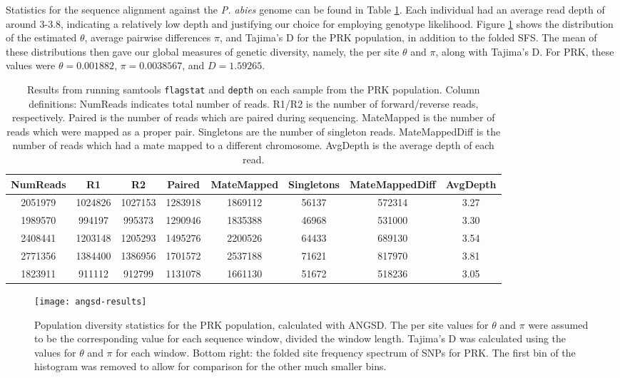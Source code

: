 \documentclass[11pt]{scrartcl}
\begin{document}
Statistics for the sequence alignment against the \textit{P. abies}
genome can be found in Table \ref{tbl:bamstat}. Each individual had an
average read depth of around 3-3.8, indicating a relatively low depth
and justifying our choice for employing genotype likelihood. Figure
\ref{fig:angsd-results} shows the distribution of the estimated
$\theta$, average pairwise differences $\pi$, and Tajima's D for the
PRK population, in addition to the folded SFS. The mean of these
distributions then gave our global measures of genetic diversity,
namely, the per site $\theta$ and $\pi$, along with Tajima's D. For
PRK, these values were $\theta=0.001882$, $\pi=0.0038567$, and
$D=1.59265$.

\begin{table}
  \footnotesize
  \centering
  \begin{tabular}{*{8}{c}}
    NumReads & R1 & R2 & Paired & MateMapped & Singletons & MateMappedDiff & AvgDepth\\
    \hline
    2051979 & 1024826 & 1027153 & 1283918 & 1869112 & 56137 & 572314 & 3.27\\
    1989570 & 994197 & 995373 & 1290946 & 1835388 & 46968 & 531000 & 3.30\\
    2408441 & 1203148 & 1205293 & 1495276 & 2200526 & 64433 & 689130 & 3.54\\
    2771356 & 1384400 & 1386956 & 1701572 & 2537188 & 71621 & 817970 & 3.81\\
    1823911 & 911112 & 912799 & 1131078 & 1661130 & 51672 & 518236 & 3.05
  \end{tabular}
  \caption{{\footnotesize Results from running samtools \texttt{flagstat} and
    \texttt{depth} on each sample from the PRK population. Column
    definitions: NumReads indicates total number of reads. R1/R2 is
    the number of forward/reverse reads, respectively. Paired is the
    number of reads which are paired during sequencing. MateMapped is
    the number of reads which were mapped as a proper pair. Singletons
    are the number of singleton reads. MateMappedDiff is the number of
    reads which had a mate mapped to a different chromosome. AvgDepth
    is the average depth of each read.}}
\label{tbl:bamstat}
\end{table}

\begin{figure}
  \centering
  \texttt{[image: angsd-results]}
  \caption{Population diversity statistics for the PRK population,
    calculated with ANGSD. The per site values for $\theta$ and $\pi$
    were assumed to be the corresponding value for each sequence
    window, divided the window length. Tajima's D was calculated using
    the values for $\theta$ and $\pi$ for each window. Bottom right:
    the folded site frequency spectrum of SNPs for PRK. The first bin
    of the histogram was removed to allow for comparison for the other
    much smaller bins.}
  \label{fig:angsd-results}
\end{figure}
\end{document}
